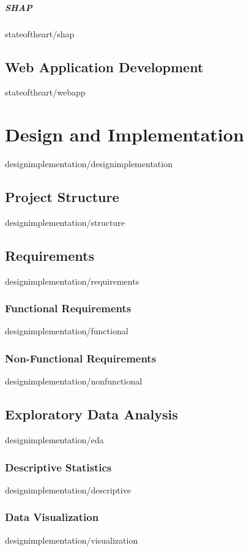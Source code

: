 \documentclass[covers, firstnumbered, tfg, extendedindex, epsbased, english, final]{tfgtfmthesisuam}
\begin{document}
\paragraph{SHAP\label{SEC:SHAP}}{stateoftheart/shap}

\section{Web Application Development}{stateoftheart/webapp}

\chapter{Design and Implementation\label{CAP:DESIGNIMPLEMENTATION}}{designimplementation/designimplementation}

\section{Project Structure}{designimplementation/structure}
\section{Requirements}{designimplementation/requirements}
\subsection{Functional Requirements}{designimplementation/functional}
\subsection{Non-Functional Requirements}{designimplementation/nonfunctional}
\section{Exploratory Data Analysis}{designimplementation/eda}
\subsection{Descriptive Statistics}{designimplementation/descriptive}
\subsection{Data Visualization}{designimplementation/visualization}
\end{document}

